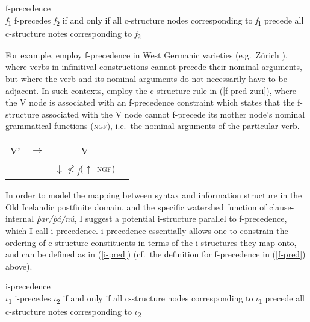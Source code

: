 \documentclass[output=paper,colorlinks,citecolor=brown]{langscibook}
\begin{document}
\ea
\label{f-pred}
         f-precedence \\
    \textit{f}\textsubscript{1} f-precedes \textit{f}\textsubscript{2} if and only if all c-structure nodes corresponding to \textit{f}\textsubscript{1} precede all c-structure notes corresponding to \textit{f}\textsubscript{2}\\
    \hfill \citep[ex.~(11)]{dalrymple2001weak}
\z 

\noindent For example, \citet[229--230]{zaenen1995formal} employ f-precedence  in  West Germanic varieties (e.g.~Zürich ), where verbs in infinitival constructions cannot precede their nominal arguments, but where the verb and its nominal arguments do not necessarily have to be adjacent. In such contexts, \citet[230]{zaenen1995formal} employ the c-structure rule in (\ref{f-pred-zuri}),  where the V node is associated with an f-precedence constraint which states that the f-structure associated with the V node cannot f-precede its mother node's nominal grammatical functions (\textsc{ngf}), i.e.~the nominal arguments of the particular verb.

\ea \label{f-pred-zuri}
\begin{tabular}{cccc}
  V'  &  $\longrightarrow$ & V\\
    &  & $\downarrow$$\nless$\textsubscript{\textit{f}}($\uparrow$ \textsc{ngf}) \\
\end{tabular}
\hfill  \citep[230]{zaenen1995formal}
\z 

In order to model the mapping between syntax and information structure in the Old Icelandic postfinite domain, and the specific watershed function of clause-internal \textit{þar/þá/nú}, I suggest a potential i-structure parallel to f-precedence, which I call i-precedence. i-precedence essentially allows one to constrain the ordering of c-structure constituents in terms of the i-structures they map onto, and can be defined as in (\ref{i-pred}) (cf.~the definition for f-precedence in (\ref{f-pred}) above).

\ea 
\label{i-pred} i-precedence\\
    \textit{$\iota$}\textsubscript{1} i-precedes \textit{$\iota$}\textsubscript{2} if and only if all c-structure nodes corresponding to \textit{$\iota$}\textsubscript{1} precede all c-structure notes corresponding to \textit{$\iota$}\textsubscript{2}
\z 
\end{document}
